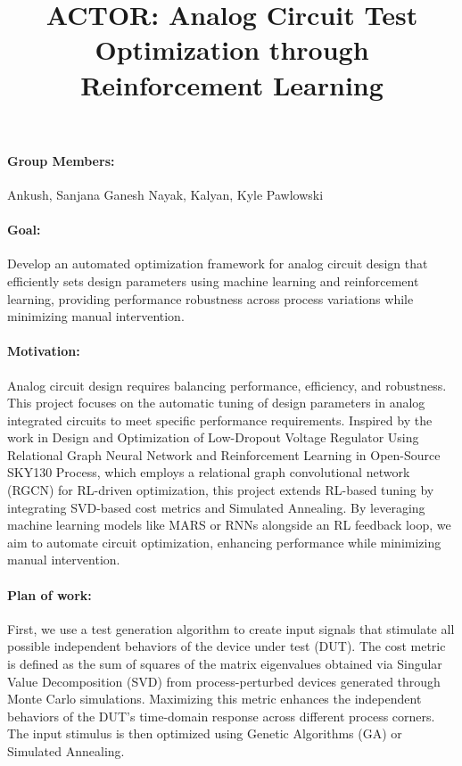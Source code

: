 \documentclass[a4paper, 12pt]{article}
\begin{document}
\title{ACTOR: Analog Circuit Test Optimization through Reinforcement Learning}

\maketitle

\paragraph
{\bf Group Members:} Ankush, Sanjana Ganesh Nayak, Kalyan, Kyle Pawlowski

\paragraph
{\bf Goal:}
Develop an automated optimization framework for analog circuit design that efficiently sets design parameters using machine learning and reinforcement learning, providing performance robustness across process variations while minimizing manual intervention.

\paragraph
{\bf Motivation:}
Analog circuit design requires balancing performance, efficiency, and robustness. This project focuses on the automatic tuning of design parameters in analog integrated circuits to meet specific performance requirements. Inspired by the work in Design and Optimization of Low-Dropout Voltage Regulator Using Relational Graph Neural Network and Reinforcement Learning in Open-Source SKY130 Process, which employs a relational graph convolutional network (RGCN) for RL-driven optimization, this project extends RL-based tuning by integrating SVD-based cost metrics and Simulated Annealing. By leveraging machine learning models like MARS or RNNs alongside an RL feedback loop, we aim to automate circuit optimization, enhancing performance while minimizing manual intervention.

\paragraph
{\bf Plan of work:}
First, we use a test generation algorithm to create input signals that stimulate all possible independent behaviors of the device under test (DUT). The cost metric is defined as the sum of squares of the matrix eigenvalues obtained via Singular Value Decomposition (SVD) from process-perturbed devices generated through Monte Carlo simulations. Maximizing this metric enhances the independent behaviors of the DUT’s time-domain response across different process corners. The input stimulus is then optimized using Genetic Algorithms (GA) or Simulated Annealing.
\end{document}

